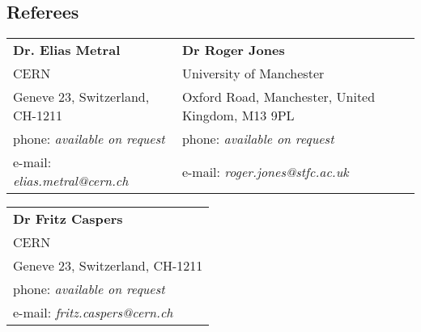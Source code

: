 \documentclass[margin,line]{resume}
\begin{document}
\begin{resume}



\section{\mysidestyle Referees} 

\begin{tabular}{@{}p{6cm}p{6cm}}
\textbf{Dr. Elias Metral}       &  \textbf{Dr Roger Jones}                   \\
CERN                     &  University of Manchester                      \\
Geneve 23, Switzerland, CH-1211           &  Oxford Road, Manchester, United Kingdom, M13 9PL        \\
phone: \textsl{available on request}    &  phone: \textsl{available on request}     \\
e-mail: \textsl{elias.metral@cern.ch}   &  e-mail: \textsl{roger.jones@stfc.ac.uk}    \\
\end{tabular}

\begin{tabular}{@{}p{6cm}}
\textbf{Dr Fritz Caspers}           \\
CERN                    		         \\
Geneve 23, Switzerland, CH-1211 \\      
phone: \textsl{available on request} \\  
e-mail: \textsl{fritz.caspers@cern.ch} \\
\end{tabular}



\end{resume}
\end{document}
